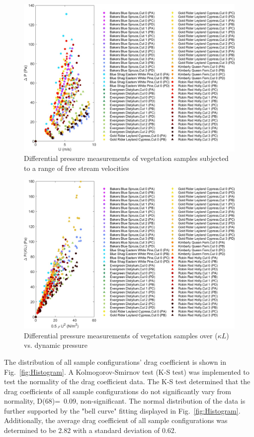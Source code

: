 \documentclass[12pt]{article}
\begin{document}
\begin{figure} [!]
	\centering
	\includegraphics[width=\textwidth,keepaspectratio]{Picture8.jpg}
	\caption{Differential pressure measurements of vegetation samples subjected to a range of free stream velocities}
	\label{fig:DPvU(Overall)}
\end{figure}

\begin{figure}
	\centering
	\includegraphics[width=\textwidth,keepaspectratio]{Picture9.jpg}
	\caption{Differential pressure measurements of vegetation samples over ($\kappa L$) vs. dynamic pressure}
	\label{fig:DPoveraf(Overall)}
\end{figure}

The distribution of all sample configurations' drag coefficient is shown in Fig.~\ref{fig:Histogram}. A Kolmogorov-Smirnov test  (K-S test) was implemented to test the normality of the drag coefficient data. The K-S test determined that the drag coefficients of all sample configurations do not significantly vary from normality, D(68)=~0.09, non-significant. The normal distribution of the data is further supported by the "bell curve" fitting displayed in  Fig.~\ref{fig:Histogram}. Additionally, the average drag coefficient of all sample configurations was determined to be 2.82 with a standard deviation of 0.62.
\end{document}
